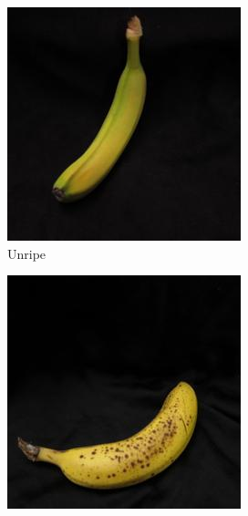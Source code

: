 \documentclass{article} %
\begin{document}
\begin{figure}[h]
\centering
  \begin{subfigure}{.123\textwidth}
  \centering
\includegraphics[width=\textwidth]{../results/q_samples/cor_pre.jpg}
\captionsetup{labelformat=empty}
\caption{Unripe}
\end{subfigure}%
\qquad
 \begin{subfigure}{.123\textwidth}
  \centering
\includegraphics[width=\textwidth]{../results/q_samples/mis_pre/RIPE_1_PRE_1.jpg}

\end{subfigure}
\end{figure}
\end{document}
